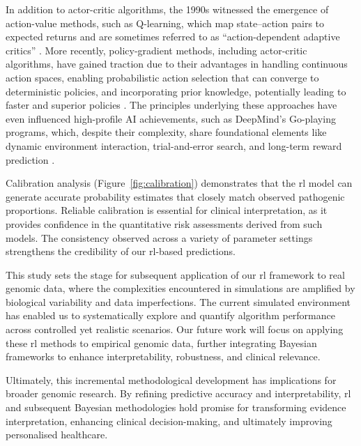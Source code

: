 In addition to actor-critic algorithms, the 1990s witnessed the emergence of action-value methods, such as Q-learning, which map state–action pairs to expected returns and are sometimes referred to as ``action-dependent adaptive critics'' 
\cite{watkins1992q, liu2001action}. 
More recently, policy-gradient methods, including actor-critic algorithms, have gained traction due to their advantages in handling continuous action spaces, enabling probabilistic action selection that can converge to deterministic policies, and incorporating prior knowledge, potentially leading to faster and superior policies \cite{anderson2000approximating}. 
The principles underlying these approaches have even influenced high-profile AI achievements, such as DeepMind's Go-playing programs, which, despite their complexity, share foundational elements like dynamic environment interaction, trial-and-error search, and long-term reward prediction
\cite{silver2016mastering, 
silver2017mastering,
sutton1998reinforcement, 
wiering2012reinforcement}.

Calibration analysis (Figure~\ref{fig:calibration}) demonstrates that the \ac{rl} model can generate accurate probability estimates that closely match observed pathogenic proportions. Reliable calibration is essential for clinical interpretation, as it provides confidence in the quantitative risk assessments derived from such models. The consistency observed across a variety of parameter settings strengthens the credibility of our \ac{rl}-based predictions.

This study sets the stage for subsequent application of our \ac{rl} framework to real genomic data, where the complexities encountered in simulations are amplified by biological variability and data imperfections. The current simulated environment has enabled us to systematically explore and quantify algorithm performance across controlled yet realistic scenarios. Our future work will focus on applying these \ac{rl} methods to empirical genomic data, further integrating Bayesian frameworks to enhance interpretability, robustness, and clinical relevance.

Ultimately, this incremental methodological development has implications for broader genomic research. By refining predictive accuracy and interpretability, \ac{rl} and subsequent Bayesian methodologies hold promise for transforming evidence interpretation, enhancing clinical decision-making, and ultimately improving personalised healthcare.

